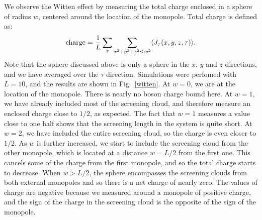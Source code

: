 \documentclass[prb,twocolumn]{revtex4-1}
\newcommand{\scripty}[1]{w}
\begin{document}
We observe the Witten effect by measuring the total charge enclosed in a sphere of radius $\scripty{r}$, centered around the location of the monopole. Total charge is defined as:
\begin{equation}
{\rm charge}=\frac{1}{L}\sum_\tau \sum_{x^2+y^2+z^2\leq w^2} \langle J_\tau(x,y,z,\tau) \rangle.
\end{equation}
Note that the sphere discussed above is only a sphere in the $x$, $y$ and $z$ directions, and we have averaged over the $\tau$ direction.
Simulations were perfomed with $L=10$, and the results are shown in Fig.~\ref{witten}.
At $\scripty{r}=0$, we are at the location of the monopole. There is nearly no boson charge bound here. At $\scripty{r}=1$, we have already included most of the screening cloud, and therefore measure an enclosed charge close to $1/2$, as expected. The fact that $\scripty{r}=1$ measures a value close to one half shows that the screening length in the system is quite short. At $\scripty{r}=2$, we have included the entire screening cloud, so the charge is even closer to $1/2$. As $\scripty{r}$ is further increased, we start to include the screening cloud from the other monopole, which is located at a distance $\scripty{r}=L/2$ from the first one. This cancels some of the charge from the first monopole, and so the total charge starts to decrease. When $\scripty{r}>L/2$, the sphere encompasses the screening clouds from both external monopoles and so there is a net charge of nearly zero. The values of charge are negative because we measured around a monopole of positive charge, and the sign of the charge in the screening cloud is the opposite of the sign of the monopole. 
\end{document}
